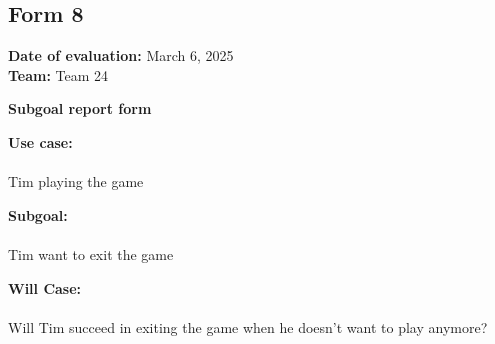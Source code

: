 \documentclass[12pt, titlepage]{article}
\begin{document}
\subsection{Form 8}
\noindent \textbf{Date of evaluation:} March 6, 2025\\
\textbf{Team:} Team 24

\vspace{0.5cm}
\noindent \textbf{\large Subgoal report form}

\vspace{0.3cm}
\noindent \textbf{Use case:} \\\\
Tim playing the game


\vspace{0.5cm}
\noindent \textbf{Subgoal:} \\\\
Tim want to exit the game

\vspace{0.5cm}
\noindent \textbf{Will Case:} \\\\
Will Tim succeed in exiting the game when he doesn't want to play anymore?
\end{document}
